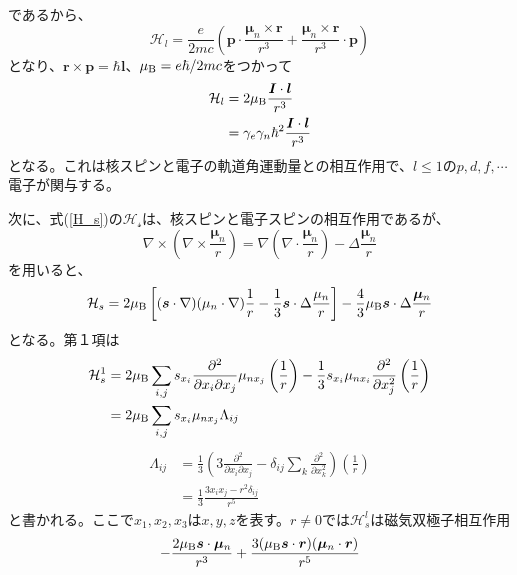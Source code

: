 \documentclass[11pt,a4j]{jreport}
\begin{document}
であるから、
\begin{equation}
  \mathcal{H}_l=\frac{e}{2mc}\left(\bm p\cdot\frac{\bm{\mu}_n\times\bm{r}}{r^3}+\frac{\bm{\mu}_n\times\bm{r}}{r^3}\cdot\bm{p}\right)
\end{equation}
となり、$\bm{r}\times\bm{p}=\hbar\bm{l}$、$\mu_{\text B}=e\hbar/2mc$をつかって
  \begin{align}
    \mathcal{H}_l&=2\mu_{\text B}\frac{\bm{I}\cdot\bm{l}}{r^3}\\
    &=\gamma_e\gamma_n\hbar^2\frac{\bm{I}\cdot\bm{l}}{r^3}
    \label{H_orb}
  \end{align}
となる。これは核スピンと電子の軌道角運動量との相互作用で、$l\leq1$の$p,d,f,\cdots$電子が関与する。\par
次に、式(\ref{H_s})の$\mathcal{H_s}$は、核スピンと電子スピンの相互作用であるが、
\begin{equation}
  \nabla \times \left( \nabla \times \frac{\bm{\mu}_n}{r} \right) = \nabla\left( \nabla \cdot \frac{\bm{\mu}_n}{r} \right) - \Delta \frac{\bm{\mu}_n}{r}
\end{equation}
を用いると、
\begin{equation}
  \mathcal{H}_s=2\mu_{\text B}\left[(\bm{s}\cdot\nabla)(\mu_n\cdot\nabla)\frac{1}{r}-\frac{1}{3}\bm{s}\cdot\Delta\frac{\mu_n}{r}\right]-\frac{4}{3}\mu_{\text B}\bm{s}\cdot\Delta\frac{\bm{\mu}_n}{r}
  \label{H_s_2}
\end{equation}
となる。第１項は
\begin{align}
  \mathcal{H}_s^1 &= 2 \mu_{\text B} \sum_{i,j} s_{x_i} \frac{\partial^2}{\partial x_i \partial x_j} \mu_{n x_j} \left( \frac{1}{r} \right) - \frac{1}{3} s_{x_i} \mu_{n x_i} \frac{\partial^2}{\partial x_j^2} \left( \frac{1}{r} \right)\\
  &=2\mu_{\text B} \sum_{i,j} s_{x_i} \mu_{n x_j} \Lambda_{ij}
\end{align}
\begin{align}
  \Lambda_{ij} &= \frac{1}{3} \left(3 \frac{\partial^2}{\partial x_i \partial x_j} - \delta_{ij} \sum_k \frac{\partial^2}{\partial x_k^2} \right) \left( \frac{1}{r} \right)\\
  &= \frac{1}{3} \frac{3x_i x_j - r^2 \delta_{ij}}{r^5}
\end{align}
と書かれる。ここで$x_1,x_2,x_3$は$x,y,z$を表す。$r\neq0$では$\mathcal{H}_s^l$は磁気双極子相互作用
\begin{equation}
  -\frac{2\mu_{\text B}\bm{s}\cdot\bm{\mu}_n}{r^3}+\frac{3(\mu_{\text B}\bm{s}\cdot\bm{r})(\bm{\mu}_n\cdot\bm{r})}{r^5}
\end{equation}
\end{document}
